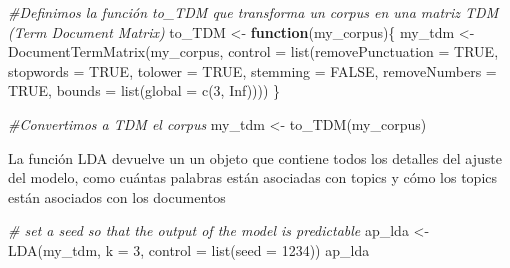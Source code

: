\documentclass[
]{book}
\newenvironment{Shaded}{\begin{snugshade}}{\end{snugshade}}
\newcommand{\AttributeTok}[1]{\textcolor[rgb]{0.77,0.63,0.00}{#1}}
\newcommand{\CommentTok}[1]{\textcolor[rgb]{0.56,0.35,0.01}{\textit{#1}}}
\newcommand{\ConstantTok}[1]{\textcolor[rgb]{0.00,0.00,0.00}{#1}}
\newcommand{\ControlFlowTok}[1]{\textcolor[rgb]{0.13,0.29,0.53}{\textbf{#1}}}
\newcommand{\DecValTok}[1]{\textcolor[rgb]{0.00,0.00,0.81}{#1}}
\newcommand{\FunctionTok}[1]{\textcolor[rgb]{0.00,0.00,0.00}{#1}}
\newcommand{\NormalTok}[1]{#1}
\newcommand{\OtherTok}[1]{\textcolor[rgb]{0.56,0.35,0.01}{#1}}
\begin{document}
\begin{Shaded}
\begin{Highlighting}[]
\CommentTok{\#Definimos la función to\_TDM que transforma un corpus en una matriz TDM (Term Document Matrix)}
\NormalTok{to\_TDM }\OtherTok{\textless{}{-}} \ControlFlowTok{function}\NormalTok{(my\_corpus)\{}
\NormalTok{  my\_tdm }\OtherTok{\textless{}{-}} \FunctionTok{DocumentTermMatrix}\NormalTok{(my\_corpus, }
                                   \AttributeTok{control =} 
                                     \FunctionTok{list}\NormalTok{(}\AttributeTok{removePunctuation =} \ConstantTok{TRUE}\NormalTok{,}
                                          \AttributeTok{stopwords =} \ConstantTok{TRUE}\NormalTok{,}
                                          \AttributeTok{tolower =} \ConstantTok{TRUE}\NormalTok{,}
                                          \AttributeTok{stemming =} \ConstantTok{FALSE}\NormalTok{,}
                                          \AttributeTok{removeNumbers =} \ConstantTok{TRUE}\NormalTok{,}
                                          \AttributeTok{bounds =} \FunctionTok{list}\NormalTok{(}\AttributeTok{global =} \FunctionTok{c}\NormalTok{(}\DecValTok{3}\NormalTok{, }\ConstantTok{Inf}\NormalTok{))))}
\NormalTok{\}         }
\end{Highlighting}
\end{Shaded}

\begin{Shaded}
\begin{Highlighting}[]
\CommentTok{\#Convertimos a TDM el corpus}
\NormalTok{my\_tdm }\OtherTok{\textless{}{-}} \FunctionTok{to\_TDM}\NormalTok{(my\_corpus)}
\end{Highlighting}
\end{Shaded}

La función LDA devuelve un un objeto que contiene todos los detalles del ajuste del modelo, como cuántas palabras están asociadas con topics y cómo los topics están asociados con los documentos

\begin{Shaded}
\begin{Highlighting}[]
\CommentTok{\# set a seed so that the output of the model is predictable}
\NormalTok{ap\_lda }\OtherTok{\textless{}{-}} \FunctionTok{LDA}\NormalTok{(my\_tdm, }\AttributeTok{k =} \DecValTok{3}\NormalTok{, }\AttributeTok{control =} \FunctionTok{list}\NormalTok{(}\AttributeTok{seed =} \DecValTok{1234}\NormalTok{))}
\NormalTok{ap\_lda}
\end{Highlighting}
\end{Shaded}
\end{document}
